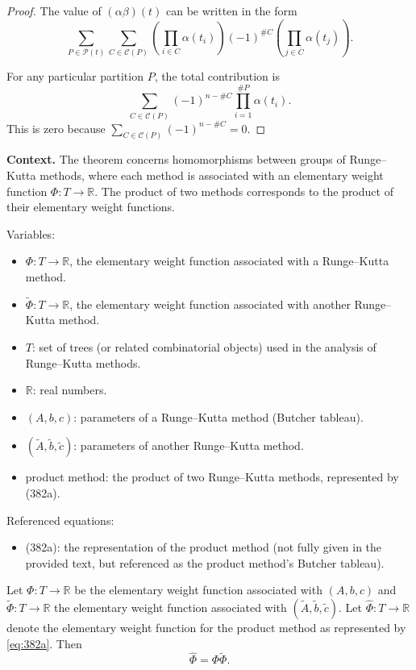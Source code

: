 \begin{theorem}
\begin{proof}
The value of $(\alpha\beta)(t)$ can be written in the form
\[
\sum_{P \in \mathcal{P}(t)} \sum_{C \in \mathcal{C}(P)} \left( \prod_{i \in C} \alpha(t_i) \right) (-1)^{\#C} \left( \prod_{j \in \overline{C}} \alpha(t_j) \right).
\]

For any particular partition $P$, the total contribution is
\[
\sum_{C \in \mathcal{C}(P)} (-1)^{n-\#C} \prod_{i=1}^{\#P} \alpha(t_i).
\]
This is zero because $\sum_{C \in \mathcal{C}(P)} (-1)^{n-\#C} = 0$.
\end{proof}

\noindent\textbf{Context.}
The theorem concerns homomorphisms between groups of Runge--Kutta methods, where each method is associated with an elementary weight function $\Phi : T \to \mathbb{R}$. The product of two methods corresponds to the product of their elementary weight functions.

Variables:
\begin{itemize}
    \item $\Phi: T \to \mathbb{R}$, the elementary weight function associated with a Runge--Kutta method.
    \item $\widetilde{\Phi}: T \to \mathbb{R}$, the elementary weight function associated with another Runge--Kutta method.
    \item $T$: set of trees (or related combinatorial objects) used in the analysis of Runge--Kutta methods.
    \item $\mathbb{R}$: real numbers.
    \item $(A, b, c)$: parameters of a Runge--Kutta method (Butcher tableau).
    \item $(\widetilde{A}, \widetilde{b}, \widetilde{c})$: parameters of another Runge--Kutta method.
    \item product method: the product of two Runge--Kutta methods, represented by (382a).
\end{itemize}

Referenced equations:
\begin{itemize}
    \item (382a): the representation of the product method (not fully given in the provided text, but referenced as the product method's Butcher tableau).
\end{itemize}

\begin{theorem}

  \label{thm:384A}
Let $\Phi : T \to \mathbb{R}$ be the elementary weight function associated with $(A, b, c)$ and $\widetilde{\Phi} : T \to \mathbb{R}$ the elementary weight function associated with $(\widetilde{A}, \widetilde{b}, \widetilde{c})$. Let $\widehat{\Phi} : T \to \mathbb{R}$ denote the elementary weight function for the product method as represented by \eqref{eq:382a}. Then
\[
\widehat{\Phi} = \Phi \widetilde{\Phi}.
\]
\end{theorem}


\end{theorem}
